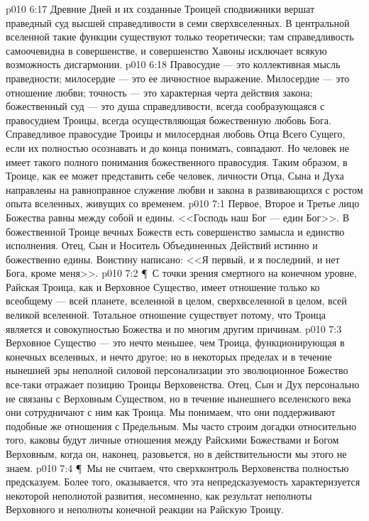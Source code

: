 \vs p010 6:17 Древние Дней и их созданные Троицей сподвижники вершат праведный суд высшей справедливости в семи сверхвселенных. В центральной вселенной такие функции существуют только теоретически; там справедливость самоочевидна в совершенстве, и совершенство Хавоны исключает всякую возможность дисгармонии.
\vs p010 6:18 Правосудие --- это коллективная мысль праведности; милосердие --- это ее личностное выражение. Милосердие --- это отношение любви; точность --- это характерная черта действия закона; божественный суд --- это душа справедливости, всегда сообразующаяся с правосудием Троицы, всегда осуществляющая божественную любовь Бога. Справедливое правосудие Троицы и милосердная любовь Отца Всего Сущего, если их полностью осознавать и до конца понимать, совпадают. Но человек не имеет такого полного понимания божественного правосудия. Таким образом, в Троице, как ее может представить себе человек, личности Отца, Сына и Духа направлены на равноправное служение любви и закона в развивающихся с ростом опыта вселенных, живущих со временем.
\vs p010 7:1 Первое, Второе и Третье лицо Божества равны между собой и едины. <<Господь наш Бог --- един Бог>>. В божественной Троице вечных Божеств есть совершенство замысла и единство исполнения. Отец, Сын и Носитель Объединенных Действий истинно и божественно едины. Воистину написано: <<Я первый, и я последний, и нет Бога, кроме меня>>.
\vs p010 7:2 \P\ С точки зрения смертного на конечном уровне, Райская Троица, как и Верховное Существо, имеет отношение только ко всеобщему --- всей планете, вселенной в целом, сверхвселенной в целом, всей великой вселенной. Тотальное отношение существует потому, что Троица является и совокупностью Божества и по многим другим причинам.
\vs p010 7:3 Верховное Существо --- это нечто меньшее, чем Троица, функционирующая в конечных вселенных, и нечто другое; но в некоторых пределах и в течение нынешней эры неполной силовой персонализации это эволюционное Божество все\hyp{}таки отражает позицию Троицы Верховенства. Отец, Сын и Дух персонально не связаны с Верховным Существом, но в течение нынешнего вселенского века они сотрудничают с ним как Троица. Мы понимаем, что они поддерживают подобные же отношения с Предельным. Мы часто строим догадки относительно того, каковы будут личные отношения между Райскими Божествами и Богом Верховным, когда он, наконец, разовьется, но в действительности мы этого не знаем.
\vs p010 7:4 \P\ Мы не считаем, что сверхконтроль Верховенства полностью предсказуем. Более того, оказывается, что эта непредсказуемость характеризуется некоторой неполнотой развития, несомненно, как результат неполноты Верховного и неполноты конечной реакции на Райскую Троицу.
